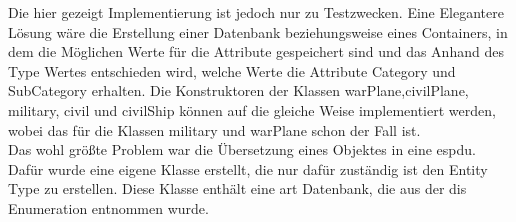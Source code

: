 Die hier gezeigt Implementierung ist jedoch nur zu Testzwecken. Eine Elegantere Lösung wäre die Erstellung einer Datenbank beziehungsweise eines Containers, in dem die Möglichen Werte für die Attribute gespeichert sind und das Anhand des  \glqq Type\grqq{}  Wertes entschieden wird, welche Werte die Attribute  \glqq Category\grqq{} und \glqq SubCategory\grqq{} erhalten. Die Konstruktoren der Klassen  \glqq warPlane\grqq{},\glqq civilPlane\grqq{}, \glqq military\grqq{}, \glqq civil\grqq{} und \glqq civilShip\grqq{} können auf die gleiche Weise implementiert werden, wobei das für die Klassen \glqq military\grqq{} und \glqq warPlane\grqq{} schon der Fall ist.\\
Das wohl größte Problem war die Übersetzung eines Objektes in eine \ac{espdu}. Dafür wurde eine eigene Klasse erstellt, die nur dafür zuständig ist den \glqq Entity Type\grqq{} zu erstellen. Diese Klasse enthält eine art Datenbank, die aus der \ac{dis} Enumeration entnommen wurde. 

